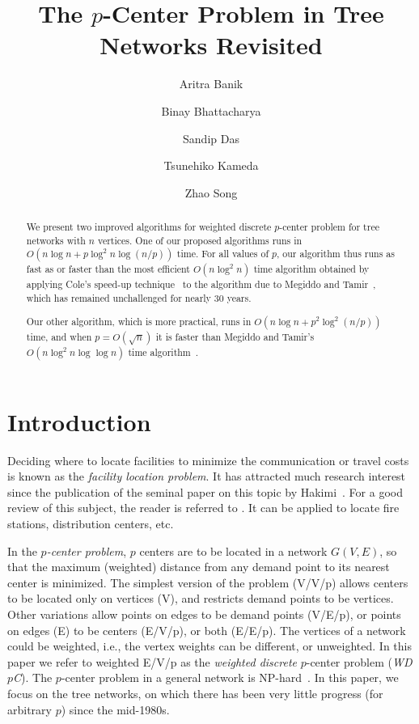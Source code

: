 \documentclass{llncs}
\begin{document}
\title{The $p$-Center Problem in Tree Networks Revisited}\author{Aritra Banik 
\and Binay Bhattacharya
\and Sandip Das
\and Tsunehiko Kameda 
\and Zhao Song 
}

\maketitle

\begin{abstract}
We present two improved algorithms for weighted discrete $p$-center problem
for tree networks with $n$ vertices.
One of our proposed algorithms runs in $O(n \log n + p \log^2 n \log(n/p))$ time.
For all values of $p$,
our algorithm thus runs as fast as or faster than the most efficient $O(n\log^2 n)$ time
algorithm obtained by applying Cole's speed-up technique~\cite{cole1987}
to the algorithm due to Megiddo and Tamir~\cite{megiddo1983c},
which has remained unchallenged for nearly 30 years.

Our other algorithm,
which is more practical,
 runs in $O(n \log n + p^2 \log^2(n/p))$ time,
and when $p=O(\sqrt{n})$ it is faster than Megiddo and Tamir's $O(n \log^2n \log\log n)$
time algorithm~\cite{megiddo1983c}.
\end{abstract}


\section{Introduction}\label{sec:introduction}
Deciding where to locate facilities  to minimize the communication or travel costs
is known as the {\em facility location problem}.
It has attracted much research interest since the publication of
the seminal paper on this topic by Hakimi~\cite{hakimi1964}.
For a good review of this subject, the reader is referred to \cite{hale2003}.
It can be applied to locate fire stations, distribution centers, etc.

In the {\em $p$-center problem},
$p$ centers are to be located in a network $G(V,E)$,
so that the maximum (weighted) distance from
any demand point to its nearest center is minimized.
The simplest version of the problem (V/V/p) allows centers to be
located only on vertices (V), and
restricts demand points to be vertices.
Other variations allow points on edges to be demand points
(V/E/p), or points on edges (E) to be centers (E/V/p), or both (E/E/p).
The vertices of a network could be weighted,
i.e., the vertex weights can be different,
or unweighted.
In this paper we refer to weighted E/V/p as the {\em weighted discrete} $p$-center problem ({\em WD$p$C}).
The $p$-center problem in a general network is NP-hard~\cite{kariv1979b}.
In this paper, we focus on  the tree networks,
on which there has been very little progress (for arbitrary $p$) since the mid-1980s.
\end{document}
